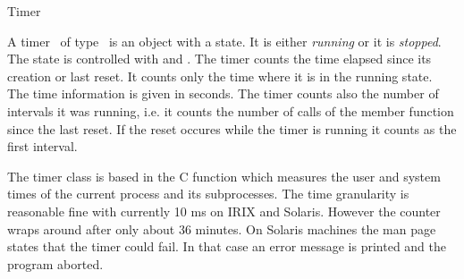 \begin{ccRefClass}{Timer}

\ccDefinition
{}

A timer \ccVar\ of type \ccRefName\ is an object with a state. It is
either {\em running\/} or it is {\em stopped}. The state is controlled
with  and  . The timer counts the
time elapsed since its creation or last reset. It counts only the time
where it is in the running state. The time information is given in seconds.
The timer counts also the number of intervals it was running, i.e. it 
counts the number of calls of the  member function since the 
last reset. If the reset occures while the timer is running it counts as the
first interval.


\ccCreation

\ccPropagateThreeToTwoColumns


\ccOperations

\ccGlue
{}
\ccGlue
{}
\ccGlue
{}

\ccGlue
{} 
\ccGlue
{}
\ccGlue
{}


\ccImplementation

The timer class is based in the C function 
which measures the user and system times of the current process and
its subprocesses.  The time granularity is reasonable fine with
currently 10 ms on IRIX and Solaris. However the counter wraps around
after only about 36 minutes. On Solaris machines the man page states
that the timer could fail. In that case an error message is printed
and the program aborted.

\end{ccRefClass}

